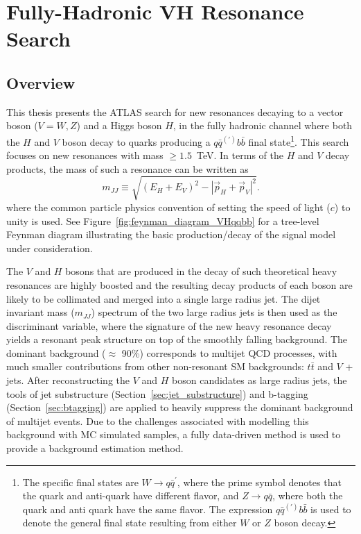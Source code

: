 \graphicspath{{Ch5_VHqqbb/figures/}}

\chapter{Fully-Hadronic VH Resonance Search}

\section{Overview}
This thesis presents the ATLAS search for new resonances decaying to a vector boson ($V = W,Z$) and a Higgs boson $H$, in the fully hadronic channel where both the $H$ and $V$ boson decay to quarks producing a $q\bar{q}^{(\prime)}b\bar{b}$ final state\footnote{The specific final states are $W \rightarrow q \bar{q}^\prime$, where the prime symbol denotes that the quark and anti-quark have different flavor, and $Z \rightarrow q\bar{q}$, where both the quark and anti quark have the same flavor. The expression $q\bar{q}^{(\prime)}b\bar{b}$ is used to denote the general final state resulting from either $W$ or $Z$ boson decay.}.
This search focuses on new resonances with mass $\geq 1.5$~TeV.
In terms of the $H$ and $V$ decay products, the mass of such a resonance can be written as
\begin{equation}
    m_{JJ} \equiv \sqrt{
        \left(E_H + E_V\right)^2
        -
        \left| \vec{p}_H + \vec{p}_V\right|^2
    }.
\end{equation}
where the common particle physics convention of setting the speed of light ($c$) to unity is used.
See Figure~\ref{fig:feynman_diagram_VHqqbb} for a tree-level Feynman diagram illustrating the basic production/decay of the signal model under consideration.

The $V$ and $H$ bosons that are produced in the decay of such theoretical heavy resonances are highly boosted and the resulting decay products of each boson are likely to be collimated and merged into a single large radius jet.
The dijet invariant mass ($m_{JJ}$) spectrum of the two large radius jets is then used as the discriminant variable, where the signature of the new heavy resonance decay yields a resonant peak structure on top of the smoothly falling background.
The dominant background ($\approx$ 90\%) corresponds to multijet QCD processes, with much smaller contributions from other non-resonant SM backgrounds: $t\bar{t}$ and $V$ + jets.
After reconstructing the $V$ and $H$ boson candidates as large radius jets, the tools of jet substructure (Section~\ref{sec:jet_substructure}) and b-tagging (Section~\ref{sec:btagging}) are applied to heavily suppress the dominant background of multijet events.
Due to the challenges associated with modelling this background with MC simulated samples, a fully data-driven method is used to provide a background estimation method.

